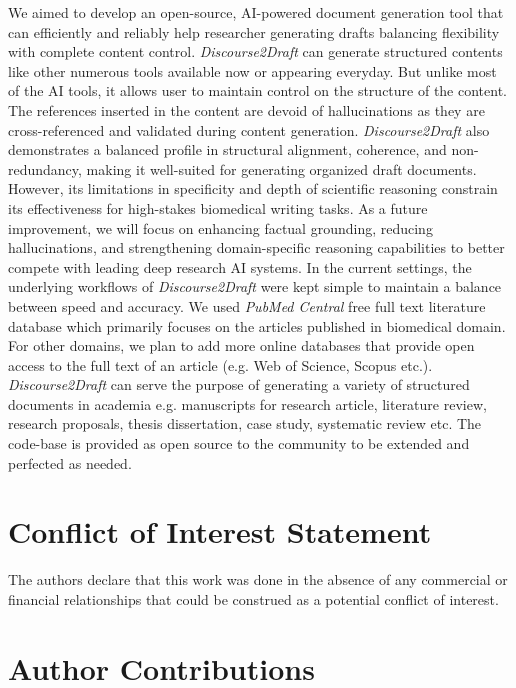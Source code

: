 \documentclass[utf8]{FrontiersinHarvard} %
\newcommand{\appname}{\emph{Discourse2Draft}}
\begin{document}
We aimed to develop an open-source, AI-powered document generation tool that can efficiently and reliably help researcher generating drafts balancing flexibility with complete content control. \appname{} can generate structured contents like other numerous tools available now or appearing everyday. But unlike most of the AI tools, it allows user to maintain control on the structure of the content. The references inserted in the content are devoid of hallucinations as they are cross-referenced and validated during content generation. \appname{} also demonstrates a balanced profile in structural alignment, coherence, and non-redundancy, making it well-suited for generating organized draft documents. However, its limitations in specificity and depth of scientific reasoning constrain its effectiveness for high-stakes biomedical writing tasks. As a future improvement, we will focus on enhancing factual grounding, reducing hallucinations, and strengthening domain-specific reasoning capabilities to better compete with leading deep research AI systems. In the current settings, the underlying workflows of \appname{} were kept simple to maintain a balance between speed and accuracy. We used \emph{PubMed Central} free full text literature database which primarily focuses on the articles published in biomedical domain. For other domains, we plan to add more online databases that provide open access to the full text of an article (e.g. Web of Science, Scopus etc.). \appname{} can serve the purpose of generating a variety of structured documents in academia e.g. manuscripts for research article, literature review, research proposals, thesis dissertation, case study, systematic review etc. The code-base is provided as open source to the community to be extended and perfected as needed.

\section*{Conflict of Interest Statement}

The authors declare that this work was done in the absence of any commercial or financial relationships that could be construed as a potential conflict of interest.

\section*{Author Contributions}
\end{document}
